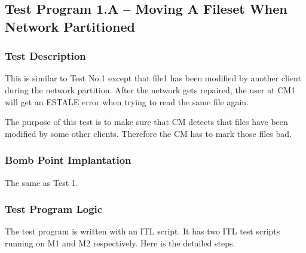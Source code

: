 \pagebreak 
\subsection {Test Program 1.A -- Moving A Fileset When Network Partitioned}

\subsubsection {Test Description}

This is similar to Test No.1 except that file1 has been modified by another
client during the network partition. After the network gets repaired, 
the user at CM1 will get an ESTALE error when trying to read the same file
again.

The purpose of this test is to make sure that CM detects that files have been modified by
some other clients. Therefore the CM has to mark those files bad.


\subsubsection {Bomb Point Implantation}

The same as Test 1.

\pagebreak
\subsubsection {Test Program Logic}

The test program is written with an ITL script. It has two ITL test scripts
running on M1 and M2 respectively. Here is the detailed steps. 

